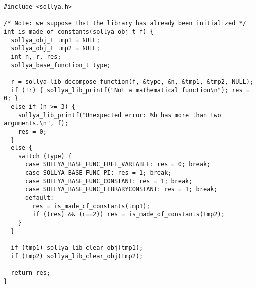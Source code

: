 \documentclass[a4paper]{article}
\begin{document}
\begin{center}\begin{minipage}{15cm}\begin{Verbatim}[frame=single]
#include <sollya.h>

/* Note: we suppose that the library has already been initialized */
int is_made_of_constants(sollya_obj_t f) {
  sollya_obj_t tmp1 = NULL;
  sollya_obj_t tmp2 = NULL;
  int n, r, res;
  sollya_base_function_t type;

  r = sollya_lib_decompose_function(f, &type, &n, &tmp1, &tmp2, NULL);
  if (!r) { sollya_lib_printf("Not a mathematical function\n"); res = 0; }
  else if (n >= 3) {
    sollya_lib_printf("Unexpected error: %b has more than two arguments.\n", f);
    res = 0;
  }
  else {
    switch (type) {
      case SOLLYA_BASE_FUNC_FREE_VARIABLE: res = 0; break;
      case SOLLYA_BASE_FUNC_PI: res = 1; break;
      case SOLLYA_BASE_FUNC_CONSTANT: res = 1; break;
      case SOLLYA_BASE_FUNC_LIBRARYCONSTANT: res = 1; break;
      default:
        res = is_made_of_constants(tmp1);
        if ((res) && (n==2)) res = is_made_of_constants(tmp2);
    }
  }

  if (tmp1) sollya_lib_clear_obj(tmp1);
  if (tmp2) sollya_lib_clear_obj(tmp2);

  return res;
}
\end{Verbatim}
\end{minipage}\end{center}
\end{document}
